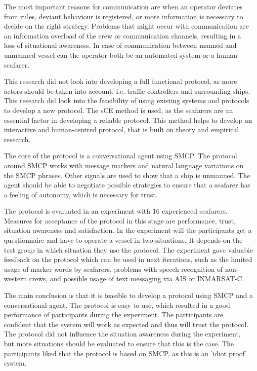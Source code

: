 The most important reasons for communication are when an operator deviates from rules, deviant behaviour is registered, or more information is necessary to decide on the right strategy. Problems that might occur with communication are an information overload of the crew or communication channels, resulting in a loss of situational awareness. In case of communication between manned and unmanned vessel can the operator both be an automated system or a human seafarer.

This research did not look into developing a full functional protocol, as more actors should be taken into account, i.e. traffic controllers and surrounding ships. This research did look into the feasibility of using existing systems and protocols to develop a new protocol. The \acf{sCE} method is used, as the seafarers are an essential factor in developing a reliable protocol. This method helps to develop an interactive and human-centred protocol, that is built on theory and empirical research.

The core of the protocol is a conversational agent using \acf{SMCP}. The protocol around SMCP works with message markers and natural language variations on the SMCP phrases. Other signals are used to show that a ship is unmanned. The agent should be able to negotiate possible strategies to ensure that a seafarer has a feeling of autonomy, which is necessary for trust.

The protocol is evaluated in an experiment with 16 experienced seafarers. Measures for acceptance of the protocol in this stage are performance, trust, situation awareness and satisfaction. In the experiment will the participants get a questionnaire and have to operate a vessel in two situations. It depends on the test group in which situation they use the protocol.
The experiment gave valuable feedback on the protocol which can be used in next iterations, such as the limited usage of marker words by seafarers, problems with speech recognition of non-western crews, and possible usage of text messaging via AIS or INMARSAT-C.

The main conclusion is that it is feasible to develop a protocol using SMCP and a conversational agent. The protocol is easy to use, which resulted in a good performance of participants during the experiment. The participants are confident that the system will work as expected and thus will trust the protocol. The protocol did not influence the situation awareness during the experiment, but more situations should be evaluated to ensure that this is the case. The participants liked that the protocol is based on SMCP, as this is an 'idiot proof' system.

